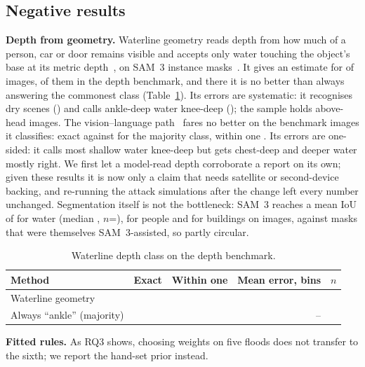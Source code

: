 \documentclass[conference]{IEEEtran}
\begin{document}
\subsection{Negative results}\label{sec:negative}
\textbf{Depth from geometry.} Waterline geometry reads depth from how much of a person, car or door remains visible and accepts only water touching the object's base at its metric depth~\cite{yang2024depthv2}, on SAM~3 instance masks~\cite{carion2026sam3}. It gives an estimate for \wlWithEstimate{} of \wlImages{} images, \wlN{} of them in the depth benchmark, and there it is no better than always answering the commonest class (Table~\ref{tab:waterline}). Its errors are systematic: it recognises dry scenes (\wlDryRight{}) and calls ankle-deep water knee-deep (\wlAnkleKnee{}); the sample holds \wlAboveHeadN{} above-head images. The vision--language path~\cite{bai2025qwen3vl,llamacpp} fares no better on the \vlmN{} benchmark images it classifies: exact \vlmExact{} against \vlmBaseExact{} for the majority class, within one \vlmWithin{}. Its errors are one-sided: it calls most shallow water knee-deep but gets chest-deep and deeper water mostly right. We first let a model-read depth corroborate a report on its own; given these results it is now only a claim that needs satellite or second-device backing, and re-running the attack simulations after the change left every number unchanged. Segmentation itself is not the bottleneck: SAM~3 reaches a mean IoU of \samWaterMean{} for water (median \samWaterMedian{}, $n$=\samWaterN{}), \samPersonMean{} for people and \samBuildingMean{} for buildings on \samImages{} images, against masks that were themselves SAM~3-assisted, so partly circular.

\begin{table}[t]
\caption{Waterline depth class on the depth benchmark.}
\label{tab:waterline}
\centering\scriptsize
\begin{tabular}{@{}lrrrr@{}}
\toprule
Method & Exact & Within one & Mean error, bins & $n$ \\
\midrule
Waterline geometry & \wlExact{} & \wlWithin{} & \wlMAE{} & \wlN{} \\
Always ``ankle'' (majority) & \wlBaseExact{} & \wlBaseWithin{} & -- & \wlN{} \\
\bottomrule
\end{tabular}
\end{table}

\textbf{Fitted rules.} As RQ3 shows, choosing weights on five floods does not transfer to the sixth; we report the hand-set prior instead.
\end{document}
